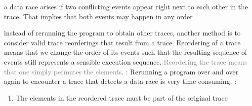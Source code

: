 \documentclass[landscape, a4paper]{article}
\begin{document}
\begin{minipage}[t]{0.2\linewidth}
\begin{betterlist}
\begin{betterlist}
			\item a \alert{data race} arises if two conflicting events appear right next to each other in the trace. That implies that both events may happen in any order
		\end{betterlist}
		\item instead of rerunning the program to obtain other traces, another method is to consider \alert{valid trace reorderings} that result from a trace. Reordering of a trace means that we change the order of its events such that the resulting sequence of events still represents a sensible execution sequence. \textcolor{gray}{Reordering the trace means that one simply permutes the elements}. : Rerunning a program over and over again to encounter a trace that detects a data race is very time consuming. :
		\begin{enumerate}
			\item The elements in the reordered trace must be part of the original trace


\end{enumerate}
\end{betterlist}
\end{minipage}
\end{document}
